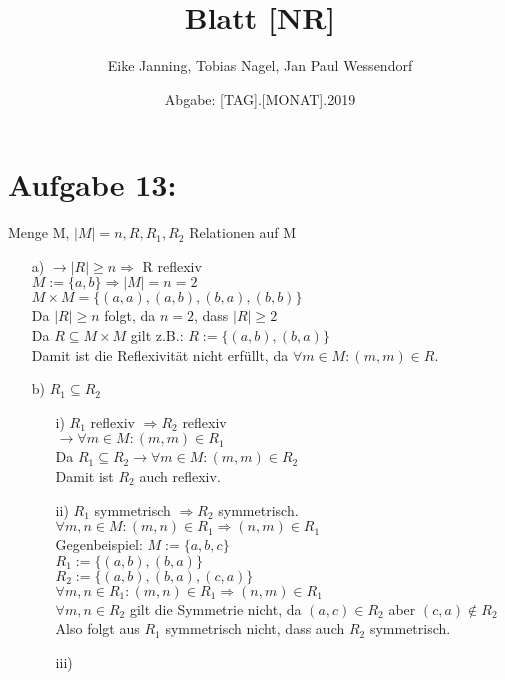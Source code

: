 \documentclass[paper = a4, ngerman]{scrartcl}
\title{Blatt [NR]}
\author{Eike Janning, Tobias Nagel, Jan Paul Wessendorf}
\date{Abgabe: [TAG].[MONAT].2019}
\begin{document}
\maketitle
\hrulefill


\section*{Aufgabe 13:}

Menge M, $|M| = n, R, R_1, R_2 $ Relationen auf M\\

\begin{itemize}
	\item[a)]
		$\rightarrow |R| \ge n \Rightarrow $ R reflexiv\\
		$M := \{a,b\} \Rightarrow |M| = n = 2$\\
		$M \times M = \{(a,a),(a,b),(b,a),(b,b)\}$\\
		Da $|R| \ge n$ folgt, da $n = 2$, dass $|R| \ge 2$\\
		Da $R \subseteq M \times M$ gilt z.B.: $R := \{(a,b),(b,a)\}$\\
		Damit ist die Reflexivität nicht erfüllt, da $\forall m \in M : (m,m) \in R$.\\
	\item[b)]
		$R_1 \subseteq R_2$
		\begin{itemize}
			\item[i)]
				$R_1$ reflexiv $\Rightarrow R_2 $ reflexiv\\
				$\rightarrow \forall m \in M : (m,m) \in R_1$\\ Da $R_1 \subseteq R_2 \rightarrow \forall m \in M : (m,m) \in R_2$\\ Damit ist $R_2$ auch reflexiv.
			\item[ii)]
				$R_1 $ symmetrisch $\Rightarrow R_2 $ symmetrisch.\\
				$\forall m,n \in M : (m,n) \in R_1 \Rightarrow (n,m) \in R_1$\\
				Gegenbeispiel: $M := \{a,b,c\}$\\
				$R_1 := \{(a,b),(b,a)\}$\\
				$R_2 := \{(a,b),(b,a),(c,a)\}$\\
				$\forall m,n \in R_1 : (m,n) \in R_1 \Rightarrow (n,m) \in R_1$\\
				$\forall m,n \in R_2 $ gilt die Symmetrie nicht, da $(a,c) \in R_2$ aber $(c,a) \notin R_2 $\\
				
				Also folgt aus 	$R_1 $ symmetrisch nicht, dass auch $R_2$ symmetrisch.
				\item[iii)]
		\end{itemize}
\end{itemize}
\end{document}
